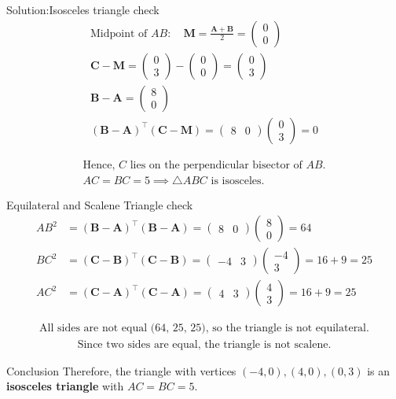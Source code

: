 \documentclass{beamer}
\numberwithin{equation}{section}
\newcommand{\myvec}[1]{\ensuremath{\begin{pmatrix}#1\end{pmatrix}}}
\let\vec\mathbf
\begin{document}
\begin{frame}{Solution:Isosceles triangle check}
    \begin{align}
\text{Midpoint of } AB: \quad \vec{M} = \frac{\vec{A}+\vec{B}}{2} = \myvec{0\\0} \\
\vec{C}-\vec{M} = \myvec{0\\3}-\myvec{0\\0} = \myvec{0\\3} \\
\vec{B}-\vec{A} = \myvec{8\\0} \\
(\vec{B}-\vec{A})^\top (\vec{C}-\vec{M}) = \myvec{8&0}\myvec{0\\3} = 0
\end{align}


\begin{align*}
\text{Hence, } C \text{ lies on the perpendicular bisector of } AB.\\
AC = BC = 5 \implies \triangle ABC \text{ is isosceles.}
\end{align*}

\end{frame}

\begin{frame}{Equilateral and Scalene Triangle check}
    \begin{align}
AB^2 &= (\vec{B}-\vec{A})^\top (\vec{B}-\vec{A}) = \myvec{8&0}\myvec{8\\0} = 64 \\
BC^2 &= (\vec{C}-\vec{B})^\top (\vec{C}-\vec{B}) = \myvec{-4&3}\myvec{-4\\3} = 16 + 9 = 25 \\
AC^2 &= (\vec{C}-\vec{A})^\top (\vec{C}-\vec{A}) = \myvec{4&3}\myvec{4\\3} = 16 + 9 = 25
\end{align}

\begin{align*}
\text{All sides are not equal (64, 25, 25), so the triangle is not equilateral.}
\end{align*}\begin{align*}
\text{Since two sides are equal, the triangle is not scalene.}
\end{align*}
\end{frame}

\begin{frame}{Conclusion}
Therefore, the triangle with vertices $(-4,0), (4,0), (0,3)$ is an \textbf{isosceles triangle} with $AC = BC = 5$.    
\end{frame}
\end{document}
